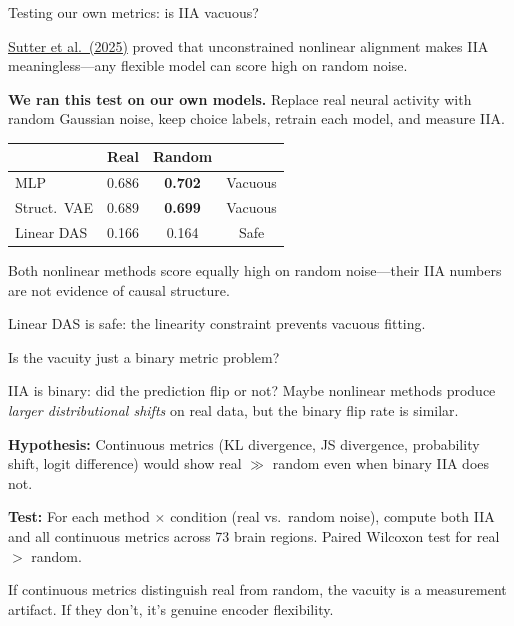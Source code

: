 \documentclass[aspectratio=169,11pt]{beamer}
\begin{document}
\begin{frame}{Testing our own metrics: is IIA vacuous?}

\href{https://arxiv.org/abs/2501.02043}{Sutter et al.\ (2025)} proved that unconstrained nonlinear alignment makes IIA meaningless---any flexible model can score high on random noise.

\vspace{0.5em}
\textbf{We ran this test on our own models.} Replace real neural activity with random Gaussian noise, keep choice labels, retrain each model, and measure IIA.

\vspace{0.5em}
\centering
{\small
\begin{tabular}{lccc}
\toprule
 & \textbf{Real} & \textbf{Random} & \\
\midrule
MLP & 0.686 & \textcolor{fail}{\textbf{0.702}} & \textcolor{fail}{Vacuous} \\
Struct.\ VAE & 0.689 & \textcolor{fail}{\textbf{0.699}} & \textcolor{fail}{Vacuous} \\
Linear DAS & 0.166 & \textcolor{pass}{0.164} & \textcolor{pass}{Safe} \\
\bottomrule
\end{tabular}
}

\vspace{0.5em}
\begin{flushleft}
Both nonlinear methods score equally high on random noise---their IIA numbers are not evidence of causal structure.

Linear DAS is safe: the linearity constraint prevents vacuous fitting.
\end{flushleft}
\end{frame}

\begin{frame}{Is the vacuity just a binary metric problem?}

IIA is binary: did the prediction flip or not? Maybe nonlinear methods produce \emph{larger distributional shifts} on real data, but the binary flip rate is similar.

\vspace{0.5em}

\textbf{Hypothesis:} Continuous metrics (KL divergence, JS divergence, probability shift, logit difference) would show real $\gg$ random even when binary IIA does not.

\vspace{0.5em}

\textbf{Test:} For each method $\times$ condition (real vs.\ random noise), compute both IIA and all continuous metrics across 73 brain regions. Paired Wilcoxon test for real $>$ random.

\vspace{0.8em}

{\small If continuous metrics distinguish real from random, the vacuity is a measurement artifact. If they don't, it's genuine encoder flexibility.}
\end{frame}
\end{document}
